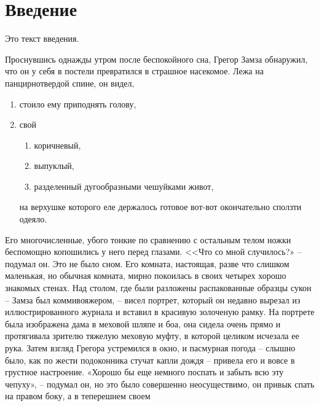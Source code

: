 
\newcommand{\No}{\textnumero}







\maketitle

\tableofcontents

\section*{Введение}
Это текст введения.

Проснувшись однажды утром после беспокойного сна, Грегор Замза обнаружил, что он у себя в постели превратился в страшное насекомое. 
Лежа на панцирнотвердой спине, он видел,

\begin{enumerate}
   \item стоило ему приподнять голову, 
   \item свой 
   \begin{enumerate}
      \item коричневый, 
      \item выпуклый, 
      \item разделенный дугообразными чешуйками живот, 
   \end{enumerate}
   
   на верхушке которого еле держалось готовое вот-вот окончательно сползти одеяло. 
   
\end{enumerate}

Его многочисленные, убого тонкие по сравнению с остальным телом ножки беспомощно копошились у него перед глазами. 
<<Что со мной случилось?» – подумал он. Это не было сном. Его комната, настоящая, разве что слишком маленькая, но обычная комната, мирно покоилась в своих четырех хорошо знакомых стенах. Над столом, где были разложены распакованные образцы сукон – Замза был коммивояжером, – висел портрет, который он недавно вырезал из иллюстрированного журнала и вставил в красивую золоченую рамку. На портрете была изображена дама в меховой шляпе и боа, она сидела очень прямо и протягивала зрителю тяжелую меховую муфту, в которой целиком исчезала ее рука. Затем взгляд Грегора устремился в окно, и пасмурная погода – слышно было, как по жести подоконника стучат капли дождя – привела его и вовсе в грустное настроение. «Хорошо бы еще немного поспать и забыть всю эту чепуху», – подумал он, но это было совершенно неосуществимо, он привык спать на правом боку, а в теперешнем своем





